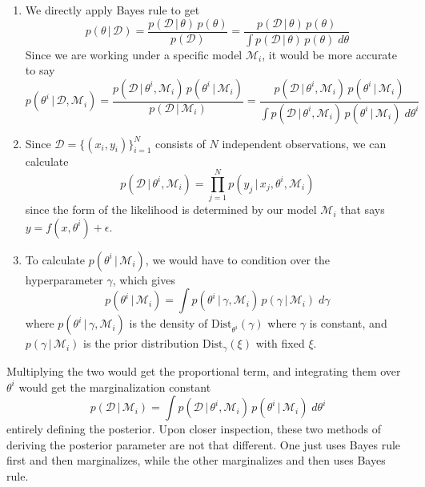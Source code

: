 \documentclass{article}
\begin{document}
    \begin{enumerate}
      \item We directly apply Bayes rule to get
      \begin{equation}
        p(\theta\,|\,\mathcal{D}) = \frac{p(\mathcal{D}\,|\,\theta)\, p(\theta)}{p(\mathcal{D})} = \frac{p(\mathcal{D}\,|\,\theta)\, p(\theta)}{\int p(\mathcal{D}\,|\,\theta)\, p(\theta)\; d\theta}
      \end{equation}
      Since we are working under a specific model $\mathcal{M}_i$, it would be more accurate to say
      \begin{equation}
        p(\theta^i \,|\,\mathcal{D}, \mathcal{M}_i) = \frac{p(\mathcal{D}\,|\,\theta^i, \mathcal{M}_i)\, p(\theta^i \,|\,\mathcal{M}_i)}{p(\mathcal{D}\,|\,\mathcal{M}_i)} = \frac{p(\mathcal{D}\,|\,\theta^i, \mathcal{M}_i)\, p(\theta^i \,|\,\mathcal{M}_i)}{\int p(\mathcal{D}\,|\,\theta^i, \mathcal{M}_i)\, p(\theta^i \,|\,\mathcal{M}_i)\; d\theta^i}
      \end{equation}

      \item Since $\mathcal{D} = \{(x_i, y_i)\}_{i=1}^N$ consists of $N$ independent observations, we can calculate
      \begin{equation}
        p(\mathcal{D}\,|\,\theta^i , \mathcal{M}_i) = \prod_{j=1}^N p(y_j \,|\,x_j, \theta^i, \mathcal{M}_i)
      \end{equation}
      since the form of the likelihood is determined by our model $\mathcal{M}_i$ that says $y = f(x, \theta^i) + \epsilon$.

      \item To calculate $p(\theta^i\,|\,\mathcal{M}_i)$, we would have to condition over the hyperparameter $\gamma$, which gives
      \begin{equation}
        p(\theta^i \,|\,\mathcal{M}_i) = \int p(\theta^i\,|\,\gamma, \mathcal{M}_i)\, p(\gamma\,|\,\mathcal{M}_i)\; d\gamma
      \end{equation}
      where $p(\theta^i\,|\,\gamma, \mathcal{M}_i)$ is the density of $\text{Dist}_{\theta^i} (\gamma)$ where $\gamma$ is constant, and $p(\gamma\,|\,\mathcal{M}_i)$ is the prior distribution $\text{Dist}_\gamma (\xi)$ with fixed $\xi$.
    \end{enumerate}

    Multiplying the two would get the proportional term, and integrating them over $\theta^i$ would get the marginalization constant
    \begin{equation}
      p(\mathcal{D}\,|\,\mathcal{M}_i) = \int p(\mathcal{D}\,|\,\theta^i, \mathcal{M}_i) \, p(\theta^i\,|\,\mathcal{M}_i)\; d\theta^i
    \end{equation}
    entirely defining the posterior. Upon closer inspection, these two methods of deriving the posterior parameter are not that different. One just uses Bayes rule first and then marginalizes, while the other marginalizes and then uses Bayes rule.
\end{document}

